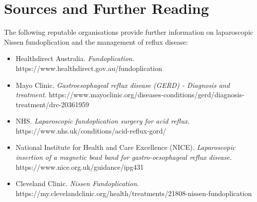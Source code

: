 \section*{Sources and Further Reading}
The following reputable organisations provide further information on laparoscopic Nissen fundoplication and the management of reflux disease:
\begin{itemize}
    \item Healthdirect Australia. \textit{Fundoplication.} https://www.healthdirect.gov.au/fundoplication
    \item Mayo Clinic. \textit{Gastroesophageal reflux disease (GERD) - Diagnosis and treatment.} https://www.mayoclinic.org/diseases-conditions/gerd/diagnosis-treatment/drc-20361959
    \item NHS. \textit{Laparoscopic fundoplication surgery for acid reflux.} https://www.nhs.uk/conditions/acid-reflux-gord/
    \item National Institute for Health and Care Excellence (NICE). \textit{Laparoscopic insertion of a magnetic bead band for gastro-oesophageal reflux disease.} https://www.nice.org.uk/guidance/ipg431
    \item Cleveland Clinic. \textit{Nissen Fundoplication.} https://my.clevelandclinic.org/health/treatments/21808-nissen-fundoplication
\end{itemize}
